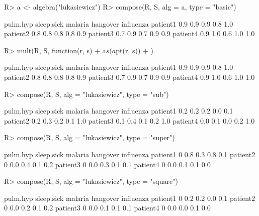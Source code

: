 \documentclass{article}\usepackage[]{graphicx}\usepackage[]{color}
\begin{document}
\begin{Schunk}
% --begin: "comp.basic"
\begin{Sinput}
R> a <- algebra("lukasiewicz")
R> compose(R, S, alg = a, type = "basic")
\end{Sinput}
\begin{Soutput}
         pulm.hyp sleep.sick malaria hangover influenza
patient1      0.9        0.9     0.9      0.8       1.0
patient2      0.8        0.8     0.8      0.8       0.9
patient3      0.7        0.9     0.7      0.9       0.9
patient4      0.9        1.0     0.6      1.0       1.0
\end{Soutput}
%
% --end: "comp.basic"
\end{Schunk}

\begin{Schunk}
% --begin: "comp.mult"
\begin{Sinput}
R> mult(R, S, function(r, s) {
+      a$s(a$pt(r, s))
+  })
\end{Sinput}
\begin{Soutput}
         pulm.hyp sleep.sick malaria hangover influenza
patient1      0.9        0.9     0.9      0.8       1.0
patient2      0.8        0.8     0.8      0.8       0.9
patient3      0.7        0.9     0.7      0.9       0.9
patient4      0.9        1.0     0.6      1.0       1.0
\end{Soutput}
%
% --end: "comp.mult"
\end{Schunk}

\begin{Schunk}
% --begin: "comp.subsupsquare"
\begin{Sinput}
R> compose(R, S, alg = "lukasiewicz", type = "sub")
\end{Sinput}
\begin{Soutput}
         pulm.hyp sleep.sick malaria hangover influenza
patient1      0.2        0.2     0.2      0.0       0.1
patient2      0.2        0.3     0.2      0.1       1.0
patient3      0.1        0.4     0.1      0.2       1.0
patient4      0.0        0.1     0.0      0.2       1.0
\end{Soutput}
\begin{Sinput}
R> compose(R, S, alg = "lukasiewicz", type = "super")
\end{Sinput}
\begin{Soutput}
         pulm.hyp sleep.sick malaria hangover influenza
patient1        0        0.8     0.3      0.8       0.1
patient2        0        0.0     0.4      0.1       0.2
patient3        0        0.0     0.3      0.1       0.1
patient4        0        0.0     0.1      0.1       0.0
\end{Soutput}
\begin{Sinput}
R> compose(R, S, alg = "lukasiewicz", type = "square")
\end{Sinput}
\begin{Soutput}
         pulm.hyp sleep.sick malaria hangover influenza
patient1        0        0.2     0.2      0.0       0.1
patient2        0        0.0     0.2      0.1       0.2
patient3        0        0.0     0.1      0.1       0.1
patient4        0        0.0     0.0      0.1       0.0
\end{Soutput}
%
% --end: "comp.subsupsquare"
\end{Schunk}
\end{document}
